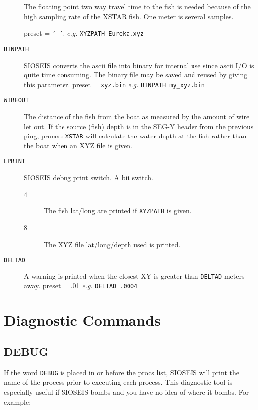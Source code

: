 \begin{description}
          The floating point two way travel time to the fish
          is needed because of the high sampling rate of the
          XSTAR fish.  One meter is several samples.

          \Gls{preset} = \texttt{' '}.    \textit{e.g.}  \texttt{XYZPATH Eureka.xyz}

\item[\texttt{BINPATH}] SIOSEIS converts the \gls{ascii} file into binary for internal
          use since \gls{ascii} I/O is quite time consuming.  The binary
          file may be saved and reused by giving this parameter.
          \Gls{preset} = \texttt{xyz.bin} \textit{e.g.} \texttt{BINPATH my\_xyz.bin}

\item[\texttt{WIREOUT}] The distance of the fish from the boat as measured by the
          amount of wire let out.  If the source (fish) depth is in
          the SEG-Y header from the previous ping, process \texttt{XSTAR} will
          calculate the water depth at the fish rather than the boat
          when an XYZ file is given.

\item[\texttt{LPRINT}] SIOSEIS debug print switch.  A bit switch.
\begin{description}
    \item[4] The fish lat/long are printed if \texttt{XYZPATH} is given.
    \item[8] The XYZ file lat/long/depth used is printed.
\end{description}

\item[\texttt{DELTAD}] A warning is printed when the closest XY is greater than
         \texttt{DELTAD} meters away.
         \Gls{preset} = .01    \textit{e.g.}   \texttt{DELTAD .0004}
\end{description}

\chapter{Diagnostic Commands}

\section{DEBUG}
\label{cmd_debug}

If the word \texttt{DEBUG} is placed in or before the
procs list, SIOSEIS will print the name of the process prior to executing
each process.  This diagnostic tool is especially useful if SIOSEIS bombs
and you have no idea of where it bombs. For example:

